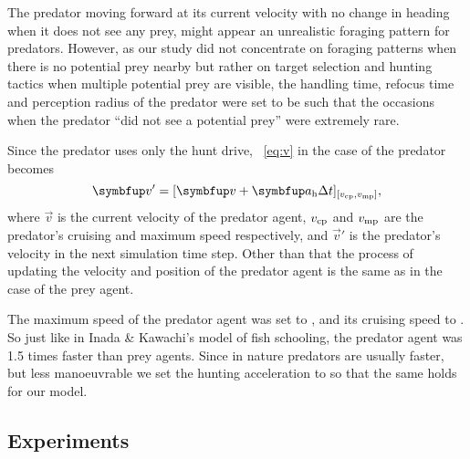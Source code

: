 The predator moving forward at its current velocity with no change in heading when it does not see any prey, might appear an unrealistic foraging pattern for predators. However, as our study did not concentrate on foraging patterns when there is no potential prey nearby but rather on target selection and hunting tactics when multiple potential prey are visible, the handling time, refocus time and perception radius of the predator were set to be such that the occasions when the predator ``did not see a potential prey'' were extremely rare.

Since the predator uses only the hunt drive, \eq~\eqref{eq:v} in the case of the predator becomes
%
\begin{equation}
  \vec{v}'=[\vec{v}+\vec{a}_\textnormal{h}\Delta t]_{[v_\textnormal{cp},v_\textnormal{mp}]},
\end{equation}
%
where $\vec{v}$ is the current velocity of the predator agent, $v_\textnormal{cp}$ and $v_\textnormal{mp}$ are the predator's cruising and maximum speed respectively, and $\vec{v}'$ is the predator's velocity in the next simulation time step. Other than that the process of updating the velocity and position of the predator agent is the same as in the case of the prey agent.

The maximum speed of the predator agent was set to , and its cruising speed to . So just like in Inada \& Kawachi's \cite{inada2002order} model of fish schooling, the predator agent was \num{1.5} times faster than prey agents. Since in nature predators are usually faster, but less manoeuvrable \cite{domenici2001scaling} we set the hunting acceleration to  so that the same holds for our model.

\subsection{Experiments}

